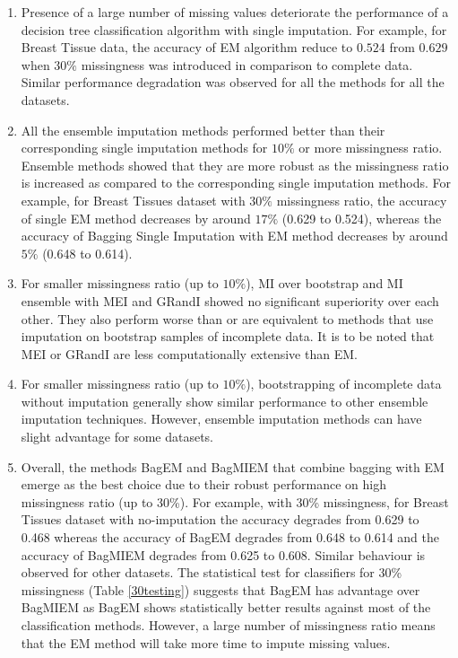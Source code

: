 \documentclass{iosart2c}
\begin{document}
\begin{enumerate}
    \item Presence of a large number of missing values deteriorate the performance of a decision tree classification algorithm with single imputation. For example, for Breast Tissue data, the accuracy of EM algorithm reduce to $0.524$ from $0.629$ when $30\%$ missingness was introduced in comparison to complete data. Similar performance degradation was observed for all the methods for all the datasets. 
    
    \item All the ensemble imputation methods performed better than their corresponding single imputation methods for $10\%$ or more missingness ratio. Ensemble methods showed that they are more robust as the missingness ratio is increased as compared to the corresponding single imputation methods. For example, for Breast Tissues dataset with $30\%$ missingness ratio, the accuracy of single EM method decreases by around $17\%$ (0.629 to 0.524), whereas the accuracy of Bagging Single Imputation with EM method decreases by around $5\%$ (0.648 to 0.614). 
    
    
     \item For smaller missingness ratio (up to $10\%$), MI over bootstrap and MI ensemble with MEI and GRandI showed no significant superiority over each other. 
     They also perform worse than or are equivalent to methods that use imputation on bootstrap samples of incomplete data. It is to be noted that MEI or GRandI are less computationally extensive than EM. 
     
     \item For smaller missingness ratio (up to $10\%$), bootstrapping of incomplete data without imputation generally show similar performance to other ensemble imputation techniques. However, ensemble imputation methods can have slight advantage for some datasets.
     
     \item Overall, the methods BagEM and  BagMIEM  that combine bagging with EM emerge as the best choice due to their robust performance on high missingness ratio (up to 30\%). For example, with 30\% missingness, for Breast Tissues dataset with no-imputation the accuracy degrades from 0.629 to 0.468 whereas the accuracy of BagEM degrades from 0.648 to 0.614 and the accuracy of BagMIEM degrades from 0.625 to 0.608. Similar behaviour is observed for other datasets. The statistical test for classifiers for 30\% missingness (Table \ref{30testing}) suggests that BagEM has advantage over BagMIEM as BagEM shows statistically better results against most of the classification methods. However, a large number of missingness ratio means that the EM method will take more time to impute missing values. 
     
\end{enumerate}
\end{document}
